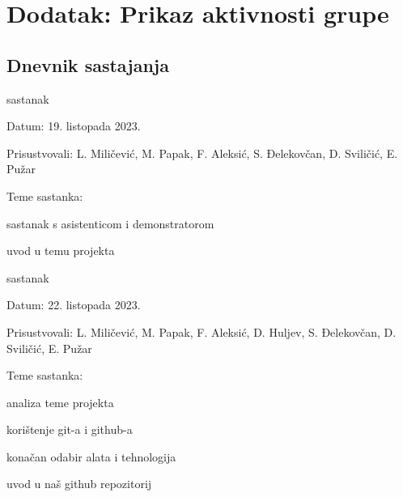 \chapter*{Dodatak: Prikaz aktivnosti grupe}
		
		\section*{Dnevnik sastajanja}
		
		
		\begin{packed_enum}
			\item  sastanak
			\item[] \begin{packed_item}
				\item Datum: 19. listopada 2023.
				\item Prisustvovali: L. Miličević, M. Papak, F. Aleksić, S. Đelekovčan, D. Sviličić, E. Pužar
				\item Teme sastanka:
				\begin{packed_item}
					\item  sastanak s asistenticom i demonstratorom
					\item  uvod u temu projekta
				\end{packed_item}
			\end{packed_item}

			\item  sastanak
			\item[] \begin{packed_item}
				\item Datum: 22. listopada 2023.
				\item Prisustvovali: L. Miličević, M. Papak, F. Aleksić, D. Huljev, S. Đelekovčan, D. Sviličić, E. Pužar
				\item Teme sastanka:
				\begin{packed_item}
					\item  analiza teme projekta
					\item  korištenje git-a i github-a
					\item  konačan odabir alata i tehnologija
					\item  uvod u naš github repozitorij
				\end{packed_item}
			\end{packed_item}
			

\end{packed_enum}
